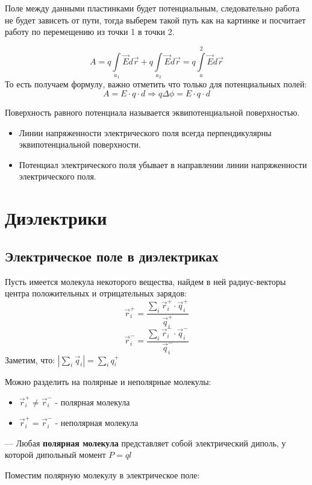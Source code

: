 \documentclass[../main.tex]{subfiles}
\begin{document}
Поле между данными пластинками будет потенциальным,
следовательно работа не будет зависеть от пути, тогда выберем такой путь как на картинке и посчитает работу по перемещению из точки 1 в точки 2.


\[A = q \int\limits_{a_1} \vec E d \vec r + q \int\limits_{a_2} \vec E d \vec r = q \int\limits_{a}^{2} \vec E d \vec r\]
То есть получаем формулу, важно отметить что только для потенциальных полей:
\[A = E \cdot q \cdot d \Rightarrow q \Delta \phi = E \cdot q \cdot d\]


 Поверхность равного потенциала называется эквипотенциальной поверхностью.
\begin{itemize}
    \item   Линии напряженности электрического поля всегда перпендикулярны эквипотенциальной поверхности.
    \item   Потенциал электрического поля убывает в направлении линии напряженности электрического поля.
\end{itemize}
\section{Диэлектрики}
\subsection{Электрическое поле в диэлектриках}
Пусть имеется молекула некоторого вещества, найдем в ней радиус-векторы центра положительных и отрицательных зарядов:
\[\vec r_i^{+} = \frac{\sum_{i} \vec r_i^{+} \cdot \vec q_i^{+}}{\vec q_i^{+}}\]
\[\vec r_i^{-} = \frac{\sum_{i} \vec r_i^{-} \cdot \vec q_i^{-}}{\vec q_i^{-}}\]
Заметим, что: $|\sum_{i} \vec q_i| = \sum_{i} q_i^{+}$

Можно разделить на полярные и неполярные молекулы:
\begin{itemize}
    \item $\vec r_i^{+} \neq \vec r_i^{-}$ - полярная молекула
    \item $\vec r_i^{+} = \vec r_i^{-}$ - неполярная молекула
\end{itemize}
--- Любая \textbf{полярная молекула} представляет собой электрический диполь, у которой дипольный момент $P = ql$

Поместим полярную молекулу в электрическое поле:
\end{document}
